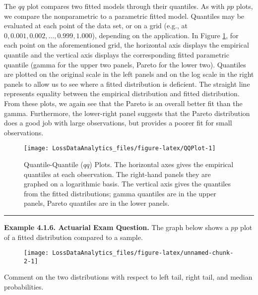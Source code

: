 \documentclass[]{book}
\theoremstyle{definition}
\theoremstyle{definition}
\theoremstyle{definition}
\theoremstyle{remark}
\begin{document}
The \(qq\) plot compares two fitted models through their quantiles. As
with \(pp\) plots, we compare the nonparametric to a parametric fitted
model. Quantiles may be evaluated at each point of the data set, or on a
grid (e.g., at \(0, 0.001, 0.002, \ldots, 0.999, 1.000\)), depending on
the application. In Figure \ref{fig:QQPlot}, for each point on the
aforementioned grid, the horizontal axis displays the empirical quantile
and the vertical axis displays the corresponding fitted parametric
quantile (gamma for the upper two panels, Pareto for the lower two).
Quantiles are plotted on the original scale in the left panels and on
the log scale in the right panels to allow us to see where a fitted
distribution is deficient. The straight line represents equality between
the empirical distribution and fitted distribution. From these plots, we
again see that the Pareto is an overall better fit than the gamma.
Furthermore, the lower-right panel suggests that the Pareto distribution
does a good job with large observations, but provides a poorer fit for
small observations.

\begin{figure}

{\centering \texttt{[image: LossDataAnalytics\_files/figure-latex/QQPlot-1]} 

}

\caption{Quantile-Quantile ($qq$) Plots. The horizontal axes gives the empirical quantiles at each observation. The right-hand panels they are graphed on a logarithmic basis. The vertical axis gives the quantiles from the fitted distributions; gamma quantiles are in the upper panels, Pareto quantiles are in the lower panels.}\label{fig:QQPlot}
\end{figure}

\begin{center}\rule{0.5\linewidth}{\linethickness}\end{center}

\textbf{Example 4.1.6. Actuarial Exam Question.} The graph below shows a
\(pp\) plot of a fitted distribution compared to a sample.

\begin{figure}

{\centering \texttt{[image: LossDataAnalytics\_files/figure-latex/unnamed-chunk-2-1]} 

}

\end{figure}

Comment on the two distributions with respect to left tail, right tail,
and median probabilities.
\end{document}
